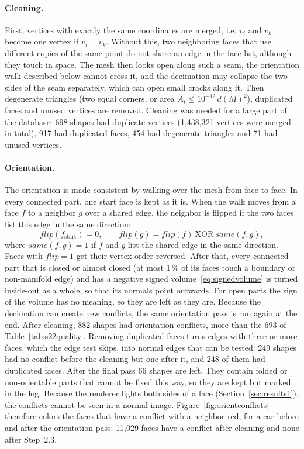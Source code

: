 \documentclass[10pt,a4paper]{article}
\begin{document}
\paragraph{Cleaning.} First, vertices with exactly the same coordinates are merged, i.e. $v_i$ and $v_k$ become one vertex if
$v_i=v_k$. Without this, two neighboring faces that use different copies of the same point do not share an edge in the face
list, although they touch in space. The mesh then looks open along such a seam, the orientation walk described below cannot
cross it, and the decimation may collapse the two sides of the seam separately, which can open small cracks along it. Then degenerate triangles (two equal corners, or area $A_t\le10^{-12}\,d(M)^2$), duplicated
faces and unused vertices are removed. Cleaning was needed for a large part of the database:
698 shapes had duplicate vertices (1,438,321 vertices were merged in total), 917 had duplicated faces, 454 had degenerate
triangles and 71 had unused vertices.

\paragraph{Orientation.} The orientation is made consistent by walking over the mesh from face to face. In every connected part,
one start face is kept as it is. When the walk moves from a face $f$ to a neighbor $g$ over a shared edge, the neighbor is
flipped if the two faces list this edge in the same direction:
\begin{equation}
  \mathit{flip}(f_{\text{start}})=0,\qquad
  \mathit{flip}(g)=\mathit{flip}(f)\ \mathrm{XOR}\ \mathit{same}(f,g),
  \label{eq:orientflip}
\end{equation}
where $\mathit{same}(f,g)=1$ if $f$ and $g$ list the shared edge in the same direction. Faces with $\mathit{flip}=1$ get their
vertex order reversed. After that, every connected part that is closed or almost closed (at most 1\,\% of its faces touch a boundary
or non-manifold edge) and has a negative signed volume~\eqref{eq:signedvolume} is turned inside-out as a whole, so that its
normals point outwards. For open parts the sign of the volume has no meaning, so they are left as they are. Because the decimation can
create new conflicts, the same orientation pass is run again at the end. After cleaning, 882 shapes had orientation conflicts,
more than the 693 of Table~\ref{tab:s22quality}. Removing duplicated faces turns edges with three or more faces, which the edge
test skips, into normal edges that can be tested: 249 shapes had no conflict before the cleaning but one after it, and 248 of
them had duplicated faces. After the final pass 66 shapes are left. They contain folded or non-orientable parts that cannot be fixed this way, so they are
kept but marked in the log. Because the renderer lights both sides of a face (Section~\ref{sec:results1}), the conflicts
cannot be seen in a normal image. Figure~\ref{fig:orientconflicts} therefore colors the faces that have a conflict with a
neighbor red, for a car before and after the orientation pass: 11,029 faces have a conflict after cleaning and none after
Step~2.3.
\end{document}
